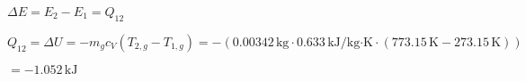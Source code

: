 \( \Delta E = E_2 - E_1 = Q_{12} \)  

\( Q_{12} = \Delta U = -m_g c_V (T_{2,g} - T_{1,g}) = -(0.00342 \, \text{kg} \cdot 0.633 \, \text{kJ/kg·K} \cdot (773.15 \, \text{K} - 273.15 \, \text{K})) \)  

\( = -1.052 \, \text{kJ} \)